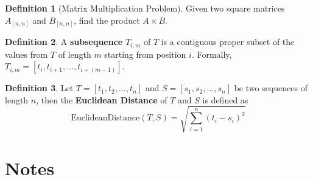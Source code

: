 \documentclass{article}
\theoremstyle{definition}
\newtheorem{definition}{Definition}
\begin{document}
\begin{definition}[Matrix Multiplication Problem]
	Given two square matrices $A_{[n,n]}$ and $B_{[n,n]}$, find the product $A\times B$.
\end{definition}

\begin{definition}
	A \textbf{subsequence} $T_{i,m}$ of $T$ is a contiguous proper subset of the values from $T$ of length $m$ starting from position $i$. Formally, $T_{i,m} = [t_i,t_{i+1},\dots,t_{i+(m-1)}]$.
\end{definition}
\begin{definition}\label{def:EuclideanDistance}
	Let $T=[t_1,t_2,\ldots,t_n]$ and $S=[s_1,s_2,\ldots,s_n]$ be two sequences of length $n$, then the \textbf{Euclidean Distance} of $T$ and $S$ is defined as
	\begin{equation*}
	\text{EuclideanDistance}(T,S) = \sqrt{\sum_{i=1}^n{(t_i-s_i)^2}}
	\end{equation*}
\end{definition}
\section{Notes}
\end{document}
